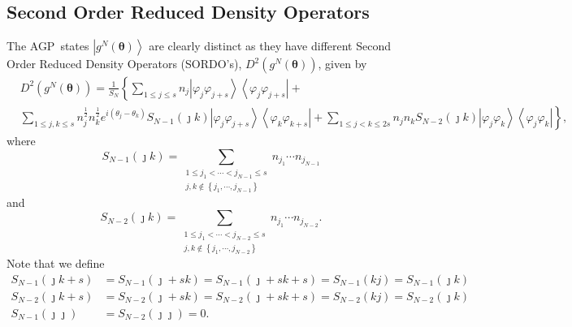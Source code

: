 \documentclass[aps,preprint]{revtex4}%
\begin{document}
\subsection{Second Order Reduced Density Operators\label{SORDO}}

The AGP\ states $\left\vert g^{N}\left(  \mathbf{\theta}\right)  \right\rangle
$ are clearly distinct as they have different Second Order Reduced Density
Operators (SORDO's), $D^{2}\left(  g^{N}\left(  \mathbf{\theta}\right)
\right)  $, given by \cite{Coleman}
\begin{align}
&  D^{2}\left(  g^{N}\left(  \mathbf{\theta}\right)  \right)  =\frac{1}{S_{N}%
}\left\{  \sum_{1\leq j\leq s}n_{j}\left\vert \varphi_{j}\varphi
_{j+s}\right\rangle \left\langle \varphi_{j}\varphi_{j+s}\right\vert \right.
+\nonumber\\
&  \left.  \sum_{1\leq j,k\leq s}n_{j}^{\frac{1}{2}}n_{k}^{\frac{1}{2}%
}e^{i\left(  \theta_{j}-\theta_{k}\right)  }S_{N-1}\left(  \jmath k\right)
\left\vert \varphi_{j}\varphi_{j+s}\right\rangle \left\langle \varphi
_{k}\varphi_{k+s}\right\vert +\sum_{1\leq j<k\leq2s}n_{j}n_{k}S_{N-2}\left(
\jmath k\right)  \left\vert \varphi_{j}\varphi_{k}\right\rangle \left\langle
\varphi_{j}\varphi_{k}\right\vert \right\}  , \label{D2}%
\end{align}
where
\begin{equation}
S_{N-1}\left(  \jmath k\right)  =\sum_{\substack{1\leq j_{1}<\cdots
<j_{N-1}\leq s\\j,k\notin\left\{  j_{1},\cdots,j_{N-1}\right\}  }}n_{j_{1}%
}\cdots n_{j_{N-1}}%
\end{equation}
and
\begin{equation}
S_{N-2}\left(  \jmath k\right)  =\sum_{\substack{1\leq j_{1}<\cdots
<j_{N-2}\leq s\\j,k\notin\left\{  j_{1},\cdots,j_{N-2}\right\}  }}n_{j_{1}%
}\cdots n_{j_{N-2}}.
\end{equation}
Note that we define
\begin{align}
S_{N-1}\left(  \jmath k+s\right)   &  =S_{N-1}\left(  \jmath+sk\right)
=S_{N-1}\left(  \jmath+sk+s\right)  =S_{N-1}\left(  kj\right)  =S_{N-1}\left(
\jmath k\right) \nonumber\\
S_{N-2}\left(  \jmath k+s\right)   &  =S_{N-2}\left(  \jmath+sk\right)
=S_{N-2}\left(  \jmath+sk+s\right)  =S_{N-2}\left(  kj\right)  =S_{N-2}\left(
\jmath k\right) \nonumber\\
S_{N-1}\left(  \jmath\jmath\right)   &  =S_{N-2}\left(  \jmath\jmath\right)
=0.
\end{align}
\end{document}
